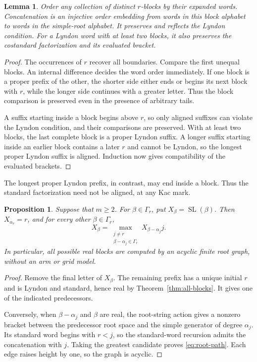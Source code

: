 \documentclass[11pt]{amsart}
\numberwithin{equation}{section}
\newtheorem{lemma}[theorem]{Lemma}
\newtheorem{proposition}[theorem]{Proposition}
\theoremstyle{definition}
\DeclareMathOperator{\SL}{SL}
\begin{document}
\begin{lemma}\label{lem:block-substitution}
Order any collection of distinct $r$-blocks by their expanded words. Concatenation is an injective order embedding from words in this block alphabet to words in the simple-root alphabet. It preserves and reflects the Lyndon condition. For a Lyndon word with at least two blocks, it also preserves the costandard factorization and its evaluated bracket.
\end{lemma}
\begin{proof}
The occurrences of $r$ recover all boundaries. Compare the first unequal blocks. An internal difference decides the word order immediately. If one block is a proper prefix of the other, the shorter side either ends or begins its next block with $r$, while the longer side continues with a greater letter. Thus the block comparison is preserved even in the presence of arbitrary tails.

A suffix starting inside a block begins above $r$, so only aligned suffixes can violate the Lyndon condition, and their comparisons are preserved. With at least two blocks, the last complete block is a proper Lyndon suffix. A longer suffix starting inside an earlier block contains a later $r$ and cannot be Lyndon, so the longest proper Lyndon suffix is aligned. Induction now gives compatibility of the evaluated brackets.
\end{proof}

The longest proper Lyndon prefix, in contrast, may end inside a block. Thus the standard factorization need not be aligned, at any Kac mark.

\begin{proposition}\label{prop:path-recursion}
Suppose that $m\geq2$. For $\beta\in\Gamma_r$, put $X_\beta=\SL(\beta)$. Then $X_{\alpha_r}=r$, and for every other $\beta\in\Gamma_r$,
\begin{equation}\label{eq:root-path}
 X_\beta=\max_{\substack{j\ne r\\\beta-\alpha_j\in\Gamma_r}}
                 X_{\beta-\alpha_j}j.
\end{equation}
In particular, all possible real blocks are computed by an acyclic finite root graph, without an arm or grid model.
\end{proposition}
\begin{proof}
Remove the final letter of $X_\beta$. The remaining prefix has a unique initial $r$ and is Lyndon and standard, hence real by Theorem~\ref{thm:all-blocks}. It gives one of the indicated predecessors.

Conversely, when $\beta-\alpha_j$ and $\beta$ are real, the root-string action gives a nonzero bracket between the predecessor root space and the simple generator of degree $\alpha_j$. Its standard word begins with $r<j$, so the standard-word recursion admits the concatenation with $j$. Taking the greatest candidate proves \eqref{eq:root-path}. Each edge raises height by one, so the graph is acyclic.
\end{proof}
\end{document}
